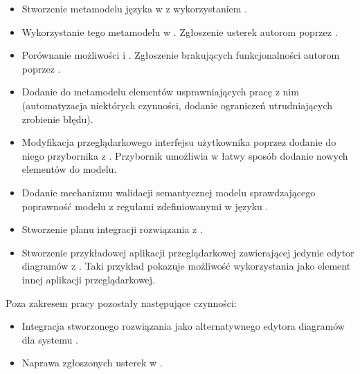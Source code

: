 \begin{itemize}
	\item Stworzenie metamodelu języka \CAL{} w \EMF{}\@ z wykorzystaniem \SiriusDesktop{}.
	\item Wykorzystanie tego metamodelu w \SiriusWeb{}. Zgłoszenie usterek autorom \SiriusWeb{} poprzez \GitHub{}.
	\item Porównanie możliwości \SiriusWeb{} i \SiriusDesktop{}. Zgłoszenie brakujących funkcjonalności autorom \SiriusWeb{} poprzez \GitHub{}.
	\item Dodanie do metamodelu elementów usprawniających pracę z nim (automatyzacja niektórych czynności, dodanie ograniczeń utrudniających zrobienie błędu).
	\item Modyfikacja przeglądarkowego interfejsu użytkownika \SiriusWeb{} poprzez dodanie do niego przybornika z \BalticLSC{}. Przybornik umożliwia w łatwy sposób dodanie nowych elementów do modelu.
	\item Dodanie mechanizmu walidacji semantycznej modelu sprawdzającego poprawność modelu z regułami zdefiniowanymi w języku \Java{}.
	\item Stworzenie planu integracji rozwiązania z \BalticLSC{}.
	\item Stworzenie przykładowej aplikacji przeglądarkowej zawierającej jedynie edytor diagramów z \SiriusWeb{}. Taki przykład pokazuje możliwość wykorzystania \SiriusWeb{} jako element innej aplikacji przeglądarkowej.
\end{itemize}

\vspace{1em}

\noindent Poza zakresem pracy pozostały następujące czynności:

\begin{itemize}
	\item Integracja stworzonego rozwiązania jako alternatywnego edytora diagramów dla systemu \BalticLSC{}.
	\item Naprawa zgłoszonych usterek w \SiriusWeb{}.
\end{itemize}
